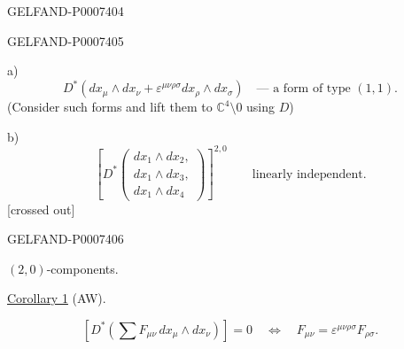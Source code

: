 \begin{GelfandAdjacentEvidence}{GELFAND-P000740}{4}

\end{GelfandAdjacentEvidence}
\begin{GelfandAdjacentEvidence}{GELFAND-P000740}{5}


a)
\[
D^*(dx_\mu\wedge dx_\nu+\varepsilon^{\mu\nu\rho\sigma}dx_\rho\wedge dx_\sigma)
\quad\text{--- a form of type }(1,1).
\]
(Consider such forms and lift them to \(\mathbb C^4\setminus0\) using \(D\))

b)
\[
\left[D^*\left(\begin{array}{l}
dx_1\wedge dx_2,\\
dx_1\wedge dx_3,\\
dx_1\wedge dx_4
\end{array}\right)\right]^{2,0}
\qquad\text{linearly independent.}
\]
[crossed out]
\end{GelfandAdjacentEvidence}
\begin{GelfandAdjacentEvidence}{GELFAND-P000740}{6}


\((2,0)\)-components.

\underline{Corollary 1} (AW).

\begin{equation*}
\tag*{(8)\hfill}
\left[D^*\left(\sum F_{\mu\nu}\,dx_\mu\wedge dx_\nu\right)\right]=0
\quad\Longleftrightarrow\quad
F_{\mu\nu}=\varepsilon^{\mu\nu\rho\sigma}F_{\rho\sigma}.
\end{equation*}
\end{GelfandAdjacentEvidence}




